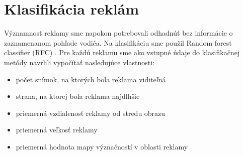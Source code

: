 \section{Klasifikácia reklám}

Významnosť reklamy sme napokon potrebovali odhadnúť bez informácie o zaznamenanom pohľade vodiča. Na klasifikáciu sme použil Random forest classifier (RFC) \cite{rfc}. Pre každú reklamu sme ako vstupné údaje do klasifikačnej metódy navrhli vypočítať nasledujúce vlastnosti:

\begin{itemize}
  \item počet snímok, na ktorých bola reklama viditeľná
  \item strana, na ktorej bola reklama najdlhšie
  \item priemerná vzdialenosť reklamy od stredu obrazu
  \item priemerná veľkosť reklamy
  \item priemerná hodnota mapy význačností v oblasti reklamy
\end{itemize}

